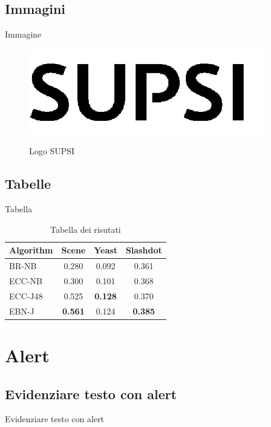 \documentclass{beamer}
\begin{document}
\subsection{Immagini}
\begin{frame}{Immagine}
\begin{figure}[ht!]
\centering
\includegraphics[scale=0.3]{SUPSI.png}
\label{fig:logoSUPSI}
\caption{Logo SUPSI}			
\end{figure}
\end{frame}

\subsection{Tabelle}
\begin{frame}{Tabella}
\begin{table}[htp!]
\label{tab:results}
\caption{Tabella dei risutati}
\begin{center}
\begin{tabular}{lccc}
\hline
Algorithm 	& Scene & Yeast & Slashdot\\
\hline
BR-NB 	& 0.280  & 0.092  & 0.361 \\
ECC-NB 	& 0.300  & 0.101  & 0.368 	\\
ECC-J48 	& 0.525  & \textbf{0.128}  & 0.370 	\\
EBN-J 		& \textbf{0.561}  & 0.124  & \textbf{0.385}	\\
\hline
\end{tabular}
\end{center}
\end{table}
\end{frame}

\section{Alert}
\subsection{Evidenziare testo con alert}
\begin{frame}{Evidenziare testo con alert}
\end{frame}
\end{document}
